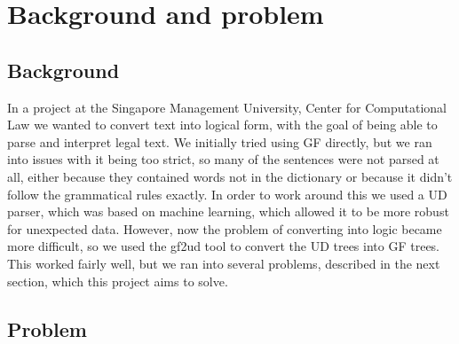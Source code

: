 \chapter{Background and problem}




% 

\section{Background}\label{sect:background}

In a project\cite{listenmaa-etal-2021-towards} at the Singapore Management University, Center for Computational Law we wanted to convert text into logical form, with the goal of being able to parse and interpret legal text. We initially tried using GF directly, but we ran into issues with it being too strict, so many of the sentences were not parsed at all, either because they contained words not in the dictionary or because it didn't follow the grammatical rules exactly. In order to work around this we used a UD parser, which was based on machine learning, which allowed it to be more robust for unexpected data. However, now the problem of converting into logic became more difficult, so we used the gf2ud tool to convert the UD trees into GF trees. This worked fairly well, but we ran into several problems, described in the next section, which this project aims to solve.

\section{Problem}



